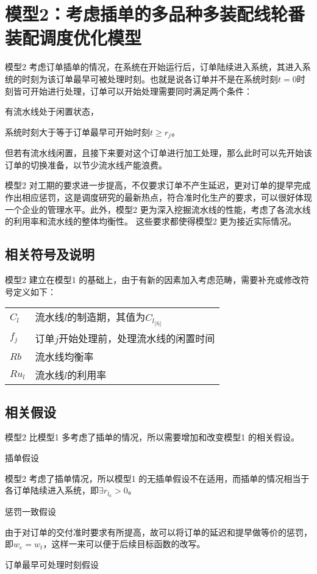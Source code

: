 \section{模型2：考虑插单的多品种多装配线轮番装配调度优化模型}
模型2 考虑订单插单的情况，在系统在开始运行后，订单陆续进入系统，其进入系统的时刻为该订单最早可被处理时刻。也就是说各订单并不是在系统时刻$t=0$时刻皆可开始进行处理，订单可以开始处理需要同时满足两个条件：
\begin{inparaenum}
\renewcommand{\theenumi}{\protect\setcounter{local}{171 + \the\value{enumi}}\protect\ding{\value{local}}}
\renewcommand{\labelenumi}{\theenumi}
\item 有流水线处于闲置状态，
\item 系统时刻大于等于订单最早可开始时刻$t \ge r_j$。
\end{inparaenum}
但若有流水线闲置，且接下来要对这个订单进行加工处理，那么此时可以先开始该订单的切换准备，以节少流水线产能浪费。

模型2 对工期的要求进一步提高，不仅要求订单不产生延迟，更对订单的提早完成作出相应惩罚，这是调度研究的最新热点，符合准时化生产的要求，可以很好体现一个企业的管理水平。此外，模型2 更为深入挖掘流水线的性能，考虑了各流水线的利用率和流水线的整体均衡性。
这些要求都使得模型2 更为接近实际情况。
\subsection{相关符号及说明}
模型2 建立在模型1 的基础上，由于有新的因素加入考虑范畴，需要补充或修改符号定义如下：

\begin{supertabular}{ll}
$C_l$ & 流水线$l$的制造期，其值为$C_{l_{|S_l|}}$ \\
$f_j$ & 订单$j$开始处理前，处理流水线的闲置时间\\
$Rb$ & 流水线均衡率 \\
$Ru_l$ & 流水线$l$的利用率\\ 
\end{supertabular}

\subsection{相关假设}
模型2 比模型1 多考虑了插单的情况，所以需要增加和改变模型1 的相关假设。
\begin{compactenum}
\item 插单假设

模型2 考虑了插单情况，所以模型1 的无插单假设不在适用，而插单的情况相当于各订单陆续进入系统，即$\exists r_{l_k} >0$。
\item 惩罚一致假设

由于对订单的交付准时要求有所提高，故可以将订单的延迟和提早做等价的惩罚，即$w_e = w_t$，这样一来可以便于后续目标函数的改写。
\item 订单最早可处理时刻假设
\end{compactenum}

